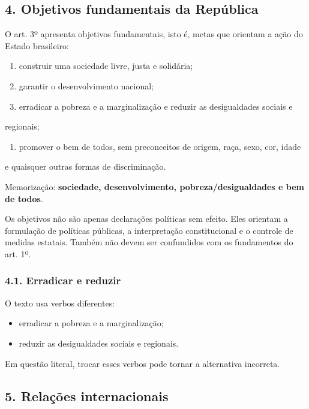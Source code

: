 \documentclass[11pt,a4paper]{article}
\begin{document}
\subsection*{4. Objetivos fundamentais da República}

O art. 3º apresenta objetivos fundamentais, isto é, metas que orientam a ação do Estado brasileiro:

\begin{enumerate}
  \item construir uma sociedade livre, justa e solidária;
  \item garantir o desenvolvimento nacional;
  \item erradicar a pobreza e a marginalização e reduzir as desigualdades sociais e
\end{enumerate}

   regionais;

\begin{enumerate}
  \item promover o bem de todos, sem preconceitos de origem, raça, sexo, cor, idade
\end{enumerate}

   e quaisquer outras formas de discriminação.

Memorização: \textbf{sociedade, desenvolvimento, pobreza/desigualdades e bem de todos}.

Os objetivos não são apenas declarações políticas sem efeito. Eles orientam a formulação de políticas públicas, a interpretação constitucional e o controle de medidas estatais. Também não devem ser confundidos com os fundamentos do art. 1º.

\subsubsection*{4.1. Erradicar e reduzir}

O texto usa verbos diferentes:

\begin{itemize}
  \item erradicar a pobreza e a marginalização;
  \item reduzir as desigualdades sociais e regionais.
\end{itemize}

Em questão literal, trocar esses verbos pode tornar a alternativa incorreta.

\subsection*{5. Relações internacionais}
\end{document}

